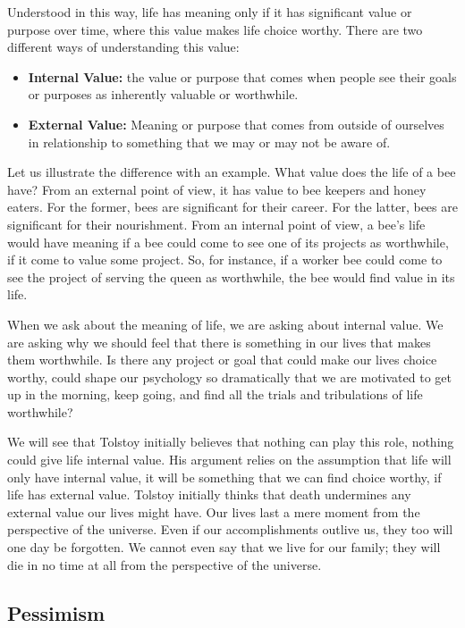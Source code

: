 \documentclass[9pt]{article}
\begin{document}
Understood in this way, life has meaning only if it has significant
value or purpose over time, where this value makes life choice worthy.
There are two different ways of understanding this value:

\begin{itemize}
\item
  \textbf{Internal Value:} the value or purpose that comes when people
  see their goals or purposes as inherently valuable or worthwhile.
\item
  \textbf{External Value:} Meaning or purpose that comes from outside of
  ourselves in relationship to something that we may or may not be aware
  of.
\end{itemize}

Let us illustrate the difference with an example. What value does the
life of a bee have? From an external point of view, it has value to bee
keepers and honey eaters. For the former, bees are significant for their
career. For the latter, bees are significant for their nourishment. From
an internal point of view, a bee's life would have meaning if a bee
could come to see one of its projects as worthwhile, if it come to value
some project. So, for instance, if a worker bee could come to see the
project of serving the queen as worthwhile, the bee would find value in
its life.

When we ask about the meaning of life, we are asking about internal
value. We are asking why we should feel that there is something in our
lives that makes them worthwhile. Is there any project or goal that
could make our lives choice worthy, could shape our psychology so
dramatically that we are motivated to get up in the morning, keep going,
and find all the trials and tribulations of life worthwhile?

We will see that Tolstoy initially believes that nothing can play this
role, nothing could give life internal value. His argument relies on the
assumption that life will only have internal value, it will be something
that we can find choice worthy, if life has external value. Tolstoy
initially thinks that death undermines any external value our lives
might have. Our lives last a mere moment from the perspective of the
universe. Even if our accomplishments outlive us, they too will one day
be forgotten. We cannot even say that we live for our family; they will
die in no time at all from the perspective of the universe.

\subsection{Pessimism}\label{pessimism}
\end{document}
